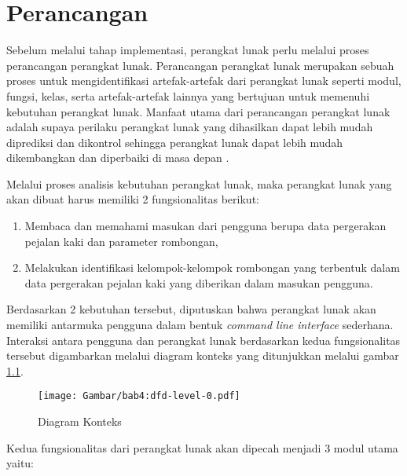 \chapter{Perancangan}
\label{chap:perancangan}

Sebelum melalui tahap implementasi, perangkat lunak perlu melalui proses perancangan perangkat lunak. Perancangan perangkat lunak merupakan sebuah proses untuk mengidentifikasi artefak-artefak dari perangkat lunak seperti modul, fungsi, kelas, serta artefak-artefak lainnya yang bertujuan untuk memenuhi kebutuhan perangkat lunak. Manfaat utama dari perancangan perangkat lunak adalah supaya perilaku perangkat lunak yang dihasilkan dapat lebih mudah diprediksi dan dikontrol sehingga perangkat lunak dapat lebih mudah dikembangkan dan diperbaiki di masa depan \cite{budgen:04:software-design}.

Melalui proses analisis kebutuhan perangkat lunak, maka perangkat lunak yang akan dibuat harus memiliki 2 fungsionalitas berikut:

\begin{enumerate}
    \item Membaca dan memahami masukan dari pengguna berupa data pergerakan pejalan kaki dan parameter rombongan,
    \item Melakukan identifikasi kelompok-kelompok rombongan yang terbentuk dalam data pergerakan pejalan kaki yang diberikan dalam masukan pengguna.
\end{enumerate}

Berdasarkan 2 kebutuhan tersebut, diputuskan bahwa perangkat lunak akan memiliki antarmuka pengguna dalam bentuk \textit{command line interface} sederhana. Interaksi antara pengguna dan perangkat lunak berdasarkan kedua fungsionalitas tersebut digambarkan melalui diagram konteks yang ditunjukkan melalui gambar \ref{bab4:context-diagram}.

\begin{figure}[h]
    \centering
    \texttt{[image: Gambar/bab4:dfd-level-0.pdf]}
    \caption{Diagram Konteks}
    \label{bab4:context-diagram}
\end{figure}

\noindent Kedua fungsionalitas dari perangkat lunak akan dipecah menjadi 3 modul utama yaitu:

